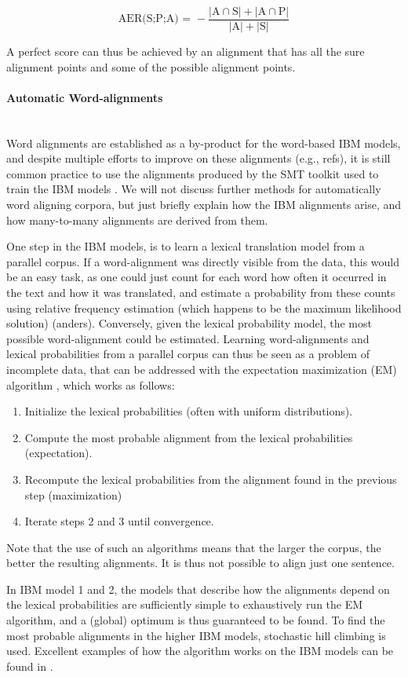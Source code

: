 \documentclass{report}
\newcommand{\myparagraph}[1]{\paragraph{#1}\mbox{}\\}
\theoremstyle{definition}
\theoremstyle{plain}
\begin{document}
$$
\text{AER(S;P;A) = } - \frac{|\text{A}\cap\text{S}| + |\text{A}\cap\text{P}|}{|\text{A}| + |\text{S}|}
$$

A perfect score can thus be achieved by an alignment that has all the sure alignment points and some of the possible alignment points.

\myparagraph{Automatic Word-alignments}
Word alignments are established as a by-product for the word-based IBM models, and despite multiple efforts to improve on these alignments (e.g., refs), it is still common practice to use the alignments produced by the SMT toolkit used to train the IBM models \citep{och03:asc}. We will not discuss further methods for automatically word aligning corpora, but just briefly explain how the IBM alignments arise, and how many-to-many alignments are derived from them.

One step in the IBM models, is to learn a lexical translation model from a parallel corpus. If a word-alignment was directly visible from the data, this would be an easy task, as one could just count for each word how often it occurred in the text and how it was translated, and estimate a probability from these counts using relative frequency estimation (which happens to be the maximum likelihood solution) (anders). Conversely, given the lexical probability model, the most possible word-alignment could be estimated. Learning word-alignments and lexical probabilities from a parallel corpus can thus be seen as a problem of incomplete data, that can be addressed with the expectation maximization (EM) algorithm \citep{dempster1977maximum}, which works as follows:\begin{enumerate}
\item Initialize the lexical probabilities (often with uniform distributions).
\item Compute the most probable alignment from the lexical probabilities (expectation).
\item Recompute the lexical probabilities from the alignment found in the previous step (maximization)
\item Iterate steps 2 and 3 until convergence.
\end{enumerate}

\noindent Note that the use of such an algorithms means that the larger the corpus, the better the resulting alignments. It is thus not possible to align just one sentence.

In IBM model 1 and 2, the models that describe how the alignments depend on the lexical probabilities are sufficiently simple to exhaustively run the EM algorithm, and a (global) optimum is thus guaranteed to be found. To find the most probable alignments in the higher IBM models, stochastic hill climbing is used. Excellent examples of how the algorithm works on the IBM models can be found in \cite[p88-113]{koehn2008statistical}.
\end{document}
